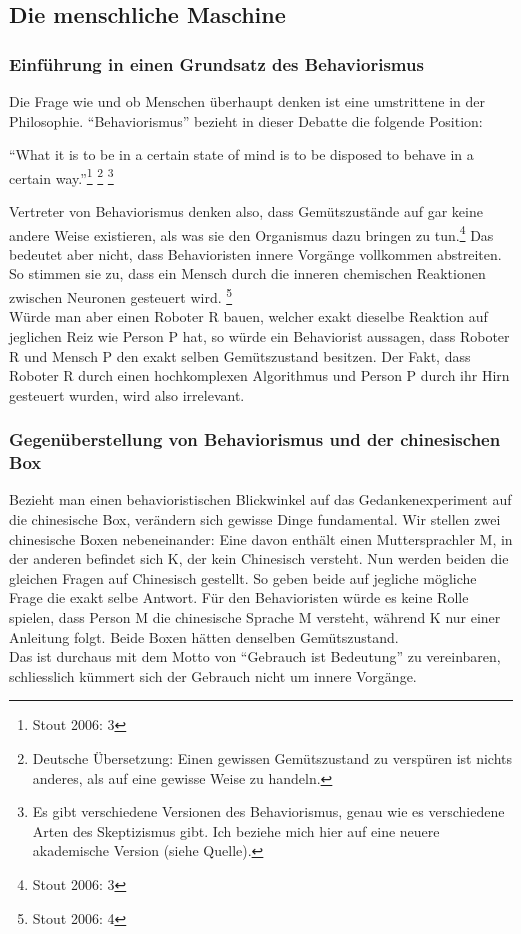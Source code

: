 \documentclass[a4paper,10pt]{article}
\begin{document}
\subsection{Die menschliche Maschine}
\subsubsection{Einführung in einen Grundsatz des Behaviorismus}
Die Frage wie und ob Menschen überhaupt denken ist eine umstrittene in der Philosophie. \enquote{Behaviorismus} bezieht in dieser Debatte die folgende Position:
\begin{displayquote}
\enquote{What it is to be in a certain state of mind is to be disposed to behave in
a certain way.}\footnote{Stout 2006: 3} \footnote{Deutsche Übersetzung: Einen gewissen Gemütszustand zu verspüren ist nichts anderes, als auf eine gewisse Weise zu handeln.} \footnote{Es gibt verschiedene Versionen des Behaviorismus, genau wie es verschiedene Arten des Skeptizismus gibt. Ich beziehe mich hier auf eine neuere akademische Version (siehe Quelle).}
\end{displayquote}
Vertreter von Behaviorismus denken also, dass Gemütszustände auf gar keine andere Weise existieren, als was sie den Organismus dazu bringen zu tun.\footnote{Stout 2006: 3} Das bedeutet aber nicht, dass Behavioristen innere Vorgänge vollkommen abstreiten. So stimmen sie zu, dass ein Mensch durch die inneren chemischen Reaktionen zwischen Neuronen gesteuert wird. \footnote{Stout 2006: 4}\\
Würde man aber einen Roboter R bauen, welcher exakt dieselbe Reaktion auf jeglichen Reiz wie Person P hat, so würde ein Behaviorist aussagen, dass Roboter R und Mensch P den exakt selben Gemütszustand besitzen. Der Fakt, dass Roboter R durch einen hochkomplexen Algorithmus und Person P durch ihr Hirn gesteuert wurden, wird also irrelevant.

\subsubsection{Gegenüberstellung von Behaviorismus und der chinesischen Box}
Bezieht man einen behavioristischen Blickwinkel auf das Gedankenexperiment auf die chinesische Box, verändern sich gewisse Dinge fundamental. Wir stellen zwei chinesische Boxen nebeneinander: Eine davon enthält einen Muttersprachler M, in der anderen befindet sich K, der kein Chinesisch versteht. Nun werden beiden die gleichen Fragen auf Chinesisch gestellt. So geben beide auf jegliche mögliche Frage die exakt selbe Antwort. Für den Behavioristen würde es keine Rolle spielen, dass Person M die chinesische Sprache M versteht, während K nur einer Anleitung folgt. Beide Boxen hätten denselben Gemütszustand. \\
Das ist durchaus mit dem Motto von \enquote{Gebrauch ist Bedeutung} zu vereinbaren, schliesslich kümmert sich der Gebrauch nicht um innere Vorgänge.
\end{document}
